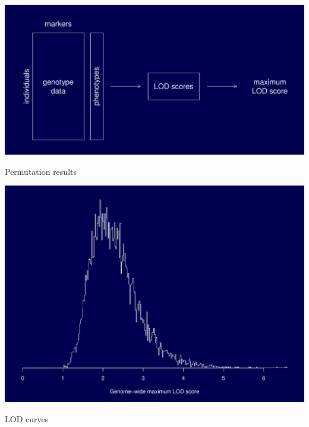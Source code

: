 \documentclass[12pt]{article}
\newcommand{\headsize}{\fontsize{35}{35} \selectfont}
\begin{document}
\vspace{2cm}

\centerline{\includegraphics{FigsA/permtest.pdf}}

\newpage

\headsize \color{myyellow}
\hfill \begin{minipage}{5.75in}
\centering
Permutation results
\end{minipage}

\vfill

\centerline{\includegraphics{FigsA/perm_hist.pdf}}



\newpage

\headsize \color{myyellow}
\hfill \begin{minipage}{5.75in}
\centering
LOD curves
\end{minipage}

\vfill
\end{document}
